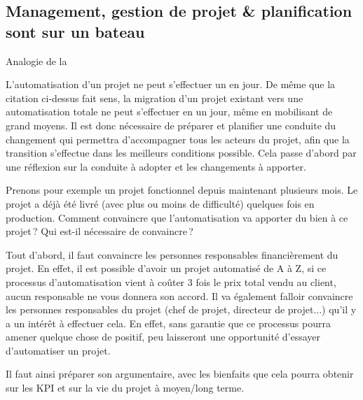\subsection{Management, gestion de projet \& planification sont sur un bateau}

\epigraph{}{Analogie de la }

L'automatisation d'un projet ne peut s'effectuer un en jour. De même que la citation ci-dessus fait sens, la migration d'un projet existant vers une automatisation totale ne peut s'effectuer en un jour, même en mobilisant de grand moyens. Il est donc nécessaire de préparer et planifier une conduite du changement qui permettra d'accompagner tous les acteurs du projet, afin que la transition s'effectue dans les meilleurs conditions possible. Cela passe d'abord par une réflexion sur la conduite à adopter et les changements à apporter. 

Prenons pour exemple un projet fonctionnel depuis maintenant plusieurs mois. Le projet a déjà été livré (avec plus ou moins de difficulté) quelques fois en production. Comment convaincre que l'automatisation va apporter du bien à ce projet ? Qui est-il nécessaire de convaincre ?

Tout d'abord, il faut convaincre les personnes responsables financièrement du projet. En effet, il est possible d'avoir un projet automatisé de A à Z, si ce processus d'automatisation vient à coûter 3 fois le prix total vendu au client, aucun responsable ne vous donnera son accord. Il va également falloir convaincre les personnes responsables du projet (chef de projet, directeur de projet...) qu'il y a un intérêt à effectuer cela. En effet, sans garantie que ce processus pourra amener quelque chose de positif, peu laisseront une opportunité d'essayer d'automatiser un projet.

Il faut ainsi préparer son argumentaire, avec les bienfaits que cela pourra obtenir sur les \gls{KPI} et sur la vie du projet à moyen/long terme.

